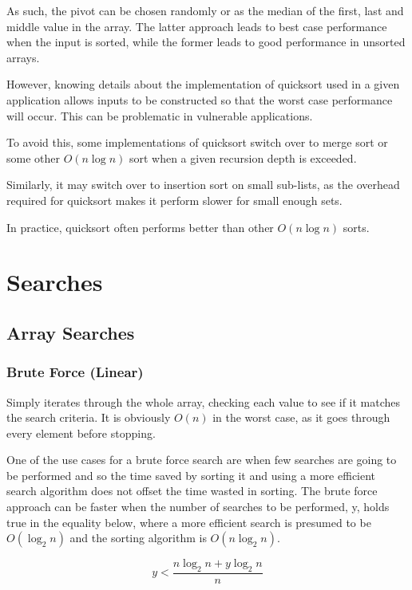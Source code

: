 \documentclass[]{article}
\begin{document}
As such, the pivot can be chosen randomly or as the median of the first, last and middle value in the array. The latter approach leads to best case performance when the input is sorted, while the former leads to good performance in unsorted arrays.

However, knowing details about the implementation of quicksort used in a given application allows inputs to be constructed so that the worst case performance will occur. This can be problematic in vulnerable applications.

To avoid this, some implementations of quicksort switch over to merge sort or some other $O(n\log{n})$ sort when a given recursion depth is exceeded.

Similarly, it may switch over to insertion sort on small sub-lists, as the overhead required for quicksort makes it perform slower for small enough sets.

In practice, quicksort often performs better than other $O(n\log{n})$ sorts.

\pagebreak

\section{Searches}

\subsection{Array Searches}

\subsubsection{Brute Force (Linear)}

Simply iterates through the whole array, checking each value to see if it matches the search criteria. It is obviously $O(n)$ in the worst case, as it goes through every element before stopping.

One of the use cases for a brute force search are when few searches are going to be performed and so the time saved by sorting it and using a more efficient search algorithm does not offset the time wasted in sorting. The brute force approach can be faster when the number of searches to be performed, y, holds true in the equality below, where a more efficient search is presumed to be $O(\log_{2}{n})$ and the sorting algorithm is $O(n\log_{2}{n})$.

\[y < \frac{n\log_{2}{n} + y\log_{2}{n}}{n}\]
\end{document}

